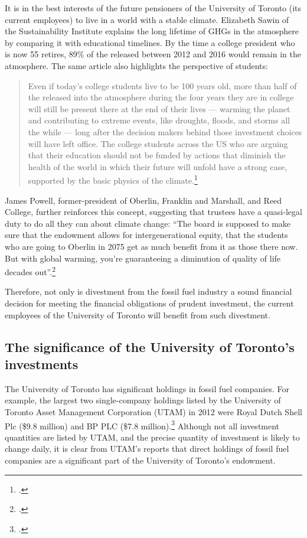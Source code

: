 It is in the best interests of the future pensioners of the University of Toronto (its current employees) to live in a world with a stable climate.
Elizabeth Sawin of the Sustainability Institute explains the long lifetime of GHGs in the atmosphere by comparing it with educational timelines.
By the time a college president who is now 55 retires, 89\% of the  released between 2012 and 2016 would remain in the atmosphere.
The same article also highlights the perspective of students: 
\begin{quote}
Even if today's college students live to be 100 years old, more than half of the  released into the atmosphere during the four years they are in college will still be present there at the end of their lives --- warming the planet and contributing to extreme events, like droughts, floods, and storms all the while --- long after the decision makers behind those investment choices will have left office. The college students across the US who are arguing that their education should not be funded by actions that diminish the health of the world in which their future will unfold have a strong case, supported by the basic physics of the climate.\footcite{ClimateInteractivePersist}
\end{quote}
James Powell, former-president of Oberlin, Franklin and Marshall, and Reed College, further reinforces this concept, suggesting that trustees have a quasi-legal duty to do all they can about climate change: ``The board is supposed to make sure that the endowment allows for intergenerational equity, that the students who are going to Oberlin in 2075 get as much benefit from it as those there now. But with global warming, you're guaranteeing a diminution of quality of life decades out''.\footcite{CaseForDivestment}



Therefore, not only is divestment from the fossil fuel industry a sound financial decision for meeting the financial obligations of prudent investment, the current employees of the University of Toronto will benefit from such divestment.



		\subsection{The significance of the University of Toronto's investments}



The University of Toronto has significant holdings in fossil fuel companies.
For example, the largest two single-company holdings listed by the University of Toronto Asset Management Corporation (UTAM) in 2012 were Royal Dutch Shell Plc (\$9.8 million) and BP PLC (\$7.8 million).\footcite{UTAM_2012_Int}
Although not all investment quantities are listed by UTAM, and the precise quantity of investment is likely to change daily, it is clear from UTAM's reports that direct holdings of fossil fuel companies are a significant part of the University of Toronto's endowment.



